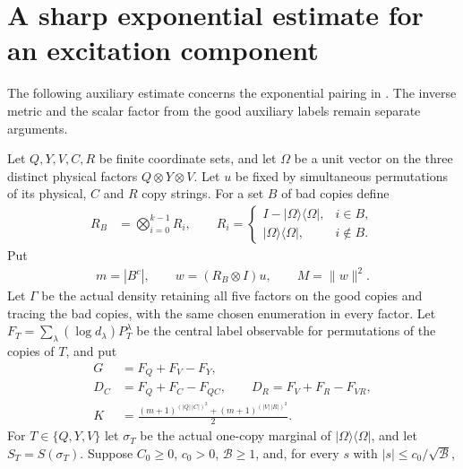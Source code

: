\section{A sharp exponential estimate for an excitation component}
\label{sec:replica_sharp_component_moment}

The following auxiliary estimate concerns the exponential pairing in
\cite[Section~7, lines~556--560]{OpenAI2026AreaLaw}. The inverse metric and
the scalar factor from the good auxiliary labels remain separate arguments.

\begin{theorem}
\label{thm:replica_sharp_component_moment}
\leanok
Let $Q,Y,V,C,R$ be finite coordinate sets, and let $\Omega$ be a unit vector
on the three distinct physical factors $Q\otimes Y\otimes V$. Let $u$ be
fixed by simultaneous permutations of its physical, $C$ and $R$ copy
strings. For a set $B$ of bad copies define
\begin{align*}
 R_B&=\bigotimes_{i=0}^{k-1} R_i,\qquad
 R_i=\begin{cases}
 I-|\Omega\rangle\langle\Omega|,&i\in B,\\
 |\Omega\rangle\langle\Omega|,&i\notin B.
 \end{cases}
\end{align*}
Put
\begin{align*}
 m=|B^c|,\qquad w=(R_B\otimes I)u,\qquad M=\|w\|^2.
\end{align*}
Let $\Gamma$ be the actual density retaining all five factors on the good
copies and tracing the bad copies, with the same chosen enumeration in
every factor. Let $F_T=\sum_\lambda(\log d_\lambda)P_T^\lambda$ be the
central label observable for permutations of the copies of $T$, and put
\begin{align*}
 G&=F_Q+F_V-F_Y,\\
 D_C&=F_Q+F_C-F_{QC},\qquad D_R=F_V+F_R-F_{VR},\\
 K&=\frac{(m+1)^{(|Q|\,|C|)^2}+(m+1)^{(|V|\,|R|)^2}}2.
\end{align*}
For $T\in\{Q,Y,V\}$ let $\sigma_T$ be the actual one-copy marginal of
$|\Omega\rangle\langle\Omega|$, and let $S_T=S(\sigma_T)$. Suppose
$C_0\ge0$, $c_0>0$, $\mathcal B\ge1$, and, for every $s$ with
$|s|\le c_0/\sqrt{\mathcal B}$,
\begin{align*}

\end{align*}
\end{theorem}

